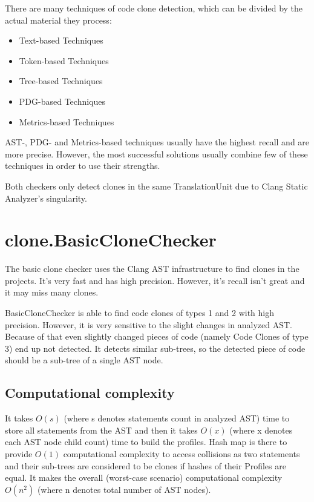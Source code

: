 \documentclass[a0,portrait]{a0poster}
\begin{document}
\begin{multicols}{2}
There are many techniques of code clone detection, which can be divided by the actual material
they process:

\begin{itemize}
\item Text-based Techniques
\item Token-based Techniques
\item Tree-based Techniques
\item PDG-based Techniques
\item Metrics-based Techniques
\end{itemize}

AST-, PDG- and Metrics-based techniques usually have the highest recall and are more precise. 
However, the most successful solutions usually combine few of these techniques in order to use
their strengths.

Both checkers only detect clones in the same TranslationUnit due to Clang Static Analyzer's
singularity.


\section*{clone.BasicCloneChecker}

The basic clone checker uses the Clang AST infrastructure to find clones in the projects. It's
very fast and has high precision. However, it's recall isn't great and it may miss many clones.

BasicCloneChecker is able to find code clones of types 1 and 2 with high precision. However, it
is very sensitive to the slight changes in analyzed AST. Because of that even slightly changed 
pieces of code (namely Code Clones of type 3) end up not detected. It detects similar sub-trees, so
the detected piece of code should be a sub-tree of a single AST node.

\subsection*{Computational complexity}

It takes $O(s)$ (where s denotes statements count in analyzed AST) time to store all statements 
from the AST and then it takes $O(x)$ (where x denotes each AST node child count) time to build the 
profiles. Hash map is there to provide $O(1)$ computational complexity to access collisions as
two statements and their sub-trees are considered to be clones if hashes of their Profiles are 
equal. It makes the overall (worst-case scenario) computational complexity $O(n^2)$ (where n 
denotes total number of AST nodes).


\end{multicols}
\end{document}
